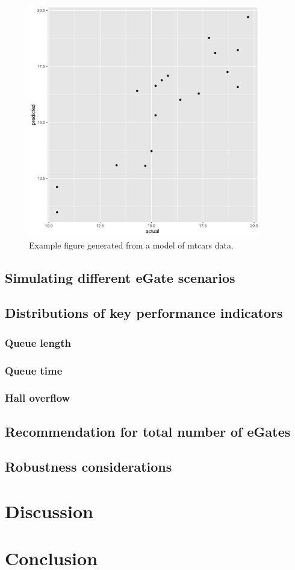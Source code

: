 \documentclass[12pt]{article}
\begin{document}
\begin{figure}[htbp]
    \centering
    \includegraphics[width=4in]{figures/mpg_model_actual_vs_predicted.png}
    \caption{Example figure generated from a model of mtcars data.}
    \label{fig:mtcars_model}
\end{figure}

\subsection{Simulating different eGate scenarios}

\subsection{Distributions of key performance indicators}

\subsubsection{Queue length}
\subsubsection{Queue time}
\subsubsection{Hall overflow}
 

\subsection{Recommendation for total number of eGates}

\subsection{Robustness considerations}

\section{Discussion}
\section{Conclusion}
% 
\end{document}

